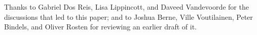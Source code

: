 Thanks to Gabriel Dos Reis, Lisa Lippincott, and Daveed Vandevoorde for the discussions that led to this paper; and to Joshua Berne, Ville Voutilainen, Peter Bindels, and Oliver Rosten for reviewing an earlier draft of it.


\renewcommand{\addcontentsline}[3]{}%








